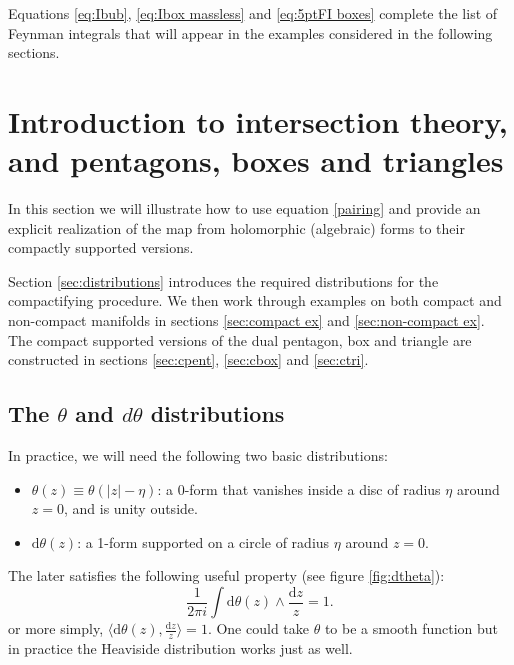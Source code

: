 \documentclass[11pt]{article}
\renewcommand{\d}{\text{d}}
\newcommand{\be}{\begin{equation}}
\newcommand{\ee}{\end{equation}}
\renewcommand{\th}{\theta}
\begin{document}
Equations \eqref{eq:Ibub}, \eqref{eq:Ibox massless} and \eqref{eq:5ptFI boxes} 
complete the list of Feynman integrals that will appear in the examples considered in the following sections. 


\section{Introduction to intersection theory, and pentagons, boxes and triangles \label{sec:intersection intro}}

In this section we will illustrate how to use equation \eqref{pairing} and provide an explicit realization of the map from holomorphic (algebraic) forms to their compactly supported versions.

Section \ref{sec:distributions} introduces the required distributions for the compactifying procedure. 
We then work through examples on both compact and non-compact manifolds in sections \ref{sec:compact ex} and \ref{sec:non-compact ex}. 
The compact supported versions of the dual pentagon, box and triangle are constructed in sections \ref{sec:cpent}, \ref{sec:cbox} and \ref{sec:ctri}.

\subsection{The $\theta$ and $d\theta$ distributions \label{sec:distributions}}

In practice, we will need the following two basic distributions:
\begin{itemize}
\item $\th(z)\equiv \theta(|z|{-}\eta)$: a 0-form that vanishes inside a disc of radius $\eta$ around $z=0$, and is unity outside.
\item $\d\th(z)$: a 1-form supported on a circle of radius $\eta$ around $z=0$.
\end{itemize}
The later satisfies the following useful property (see figure \ref{fig:dtheta}):
\be \label{eq:dtheta norm}
 \boxed{\frac{1}{2\pi i} \int \d\th(z) \wedge \frac{\d z}{z} = 1.} 
\ee
or more simply, $\langle \d\th(z),\frac{\d z}{z}\rangle=1$.
One could take $\theta$ to be a smooth function but in practice the Heaviside distribution works just as well.
\end{document}
